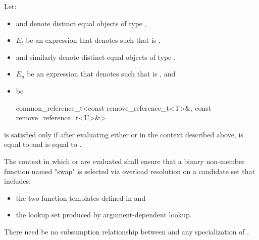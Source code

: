 \begin{itemdescr}
\pnum
Let:
\begin{itemize}
\item {} and  denote distinct equal objects of type
  ,
\item $E_t$ be an expression that denotes  such that
   is ,
\item {} and  similarly denote distinct equal objects of type
  ,
\item $E_u$ be an expression that denotes  such that
   is , and
\item {} be
  \begin{codeblock}
    common_reference_t<const remove_reference_t<T>&, const remove_reference_t<U>&>
  \end{codeblock}
\end{itemize}
 is satisfied only if after evaluating
either  or  in the context
described above,  is equal to  and  is
equal to .

\pnum
The context in which  or 
are evaluated shall ensure that a binary non-member function named "swap" is
selected via overload resolution on a candidate set that
includes:
\begin{itemize}
\item the two  function templates defined in
   and
\item the lookup set produced by argument-dependent
  lookup.
\end{itemize}

\pnum
There need be no subsumption relationship between
and any specialization of
.
\end{itemdescr}

